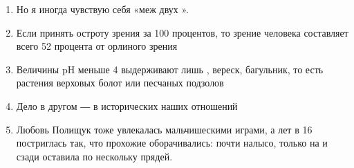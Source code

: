 \documentclass[paper=a4, fontsize=11pt]{scrartcl}
\begin{document}
\begin{enumerate}
    \item Но я иногда чувствую себя «меж двух \raisebox{-0.5cm}{\shortstack{\underline{\hspace{3cm}}\\tuli}} ».
    \item Если принять остроту зрения \raisebox{-0.5cm}{\shortstack{\underline{\hspace{3cm}}\\kotka}}  за 100 процентов, то зрение человека составляет всего 52 процента от орлиного зрения
    \item Величины pH меньше 4 выдерживают лишь  , вереск, багульник, то есть растения верховых болот или песчаных подзолов
    \item Дело в другом ― в исторических \raisebox{-0.5cm}{\shortstack{\underline{\hspace{3cm}}\\juuri}}  наших отношений
    \item Любовь Полищук тоже увлекалась мальчишескими играми, а лет в 16 постриглась так, что прохожие оборачивались: почти налысо, только на   и сзади оставила по нескольку прядей.
\end{enumerate}
\end{document}

